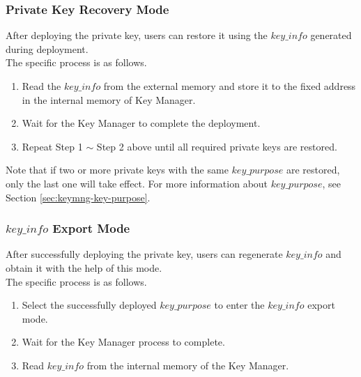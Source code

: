 \documentclass[main\_\_EN.tex]{subfiles}
\begin{document}
\subsubsection{Private Key Recovery Mode}

After deploying the private key, users can restore it using the \hyperref[para:keyinfo]{\begin{math}key\_info\end{math}} generated during deployment.\\
The specific process is as follows.
\begin{enumerate}
    \item Read the \hyperref[para:keyinfo]{\begin{math}key\_info\end{math}} from the external memory and store it to the fixed address in the internal memory of Key Manager.
    \item Wait for the Key Manager to complete the deployment.
    \item Repeat Step 1 $\sim$ Step 2 above until all required private keys are restored.
\end{enumerate}

Note that if two or more private keys with the same \begin{math}key\_purpose\end{math} are restored, only the last one will take effect. For more information about \begin{math}key\_purpose\end{math}, see Section \ref{sec:keymng-key-purpose}.

\subsubsection{\hyperref[para:keyinfo]{\begin{math}key\_info\end{math}} Export Mode}

After successfully deploying the private key, users can regenerate \hyperref[para:keyinfo]{\begin{math}key\_info\end{math}} and obtain it with the help of this mode.\\
The specific process is as follows.
\begin{enumerate}
    \item Select the successfully deployed \begin{math}key\_purpose\end{math} to enter the \hyperref[para:keyinfo]{\begin{math}key\_info\end{math}} export mode.
    \item Wait for the Key Manager process to complete.
    \item Read \hyperref[para:keyinfo]{\begin{math}key\_info\end{math}} from the internal memory of the Key Manager.
\end{enumerate}
\end{document}
